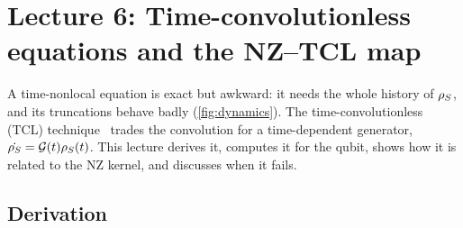 \section{Lecture 6: Time-convolutionless equations and the NZ--TCL map}
\label{sec:lec6}

A time-nonlocal equation is exact but awkward: it needs the whole history of $\rho_{S}$, and its truncations behave badly (\cref{fig:dynamics}).
The time-convolutionless (TCL) technique~\cite{Shibata1977,Chaturvedi1979,HanggiTalkner1977} trades the convolution for a time-dependent generator, $\dot{\rho_{S}}=\mathcal{G}(t)\rho_{S}(t)$.
This lecture derives it, computes it for the qubit, shows how it is related to the NZ kernel, and discusses when it fails.

\subsection{Derivation}


